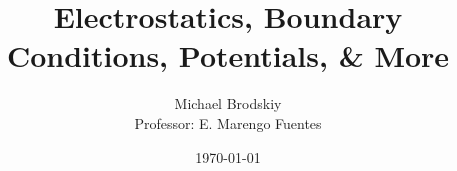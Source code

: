 


\title{Electrostatics, Boundary Conditions, Potentials, \& More}
\date{\today}
\author{Michael Brodskiy\\ \small Professor: E. Marengo Fuentes}



\maketitle

